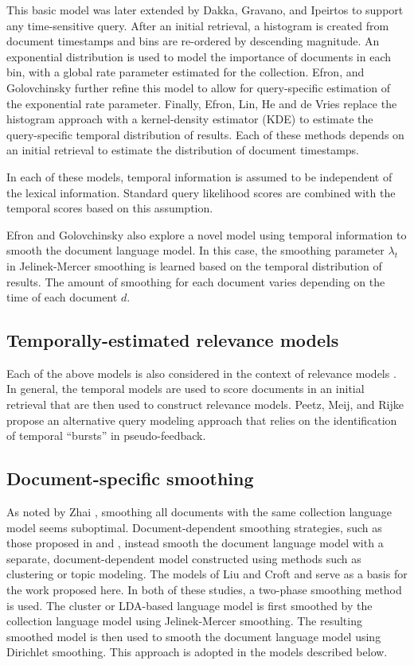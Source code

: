 \documentclass{sig-alternate}
\begin{document}
This basic model was later extended by  Dakka, Gravano, and Ipeirtos \cite{Dakka2012} to support any time-sensitive query. After an initial retrieval, a histogram is created from document timestamps and bins are re-ordered by descending magnitude. An exponential distribution is used to model the importance of documents in each bin, with a global rate parameter estimated for the collection.  Efron, and Golovchinsky \cite{Efron2011} further refine this model to allow for query-specific estimation of the exponential rate parameter.  Finally, Efron, Lin, He and de Vries \cite{Efron2014} replace the histogram approach with a kernel-density estimator (KDE) to estimate the query-specific temporal distribution of results.  Each of these methods depends on an initial retrieval to estimate the distribution of document timestamps.

In each of these models, temporal information is assumed to be independent of the lexical information. Standard query likelihood scores are combined with the temporal scores based on this assumption.

Efron and Golovchinsky \cite{Efron2011} also explore a novel model using temporal information to smooth the document language model. In this case, the smoothing parameter $\lambda_t$ in Jelinek-Mercer smoothing is learned based on the temporal distribution of results. The amount of smoothing for each document varies depending on the time of each document $d$.

\subsection{Temporally-estimated relevance models}

Each of the above models is also considered in the context of relevance models \cite{Lavrenko2001}. In general, the temporal models are used to score documents in an initial retrieval that are then used to construct relevance models.  Peetz, Meij, and Rijke \cite{Peetz2013a} propose an alternative query modeling approach that relies on the identification of temporal ``bursts'' in pseudo-feedback. 

\subsection{Document-specific smoothing}

As noted by Zhai \cite{Zhai2008}, smoothing all documents with the same collection language model seems suboptimal. Document-dependent smoothing strategies, such as those proposed in \cite{Liu2003} and  \cite{Wei2006}, instead smooth the document language model with a separate, document-dependent model constructed using methods such as clustering or topic modeling.  The models of Liu and Croft \cite{Liu2003} and \cite{Wei2006} serve as a basis for the work proposed here. In both of these studies, a two-phase smoothing method is used. The cluster or LDA-based language model is first smoothed by the collection language model using Jelinek-Mercer smoothing.  The resulting smoothed model is then used to smooth the document language model using Dirichlet smoothing. This approach is adopted in the models described below.
\end{document}
